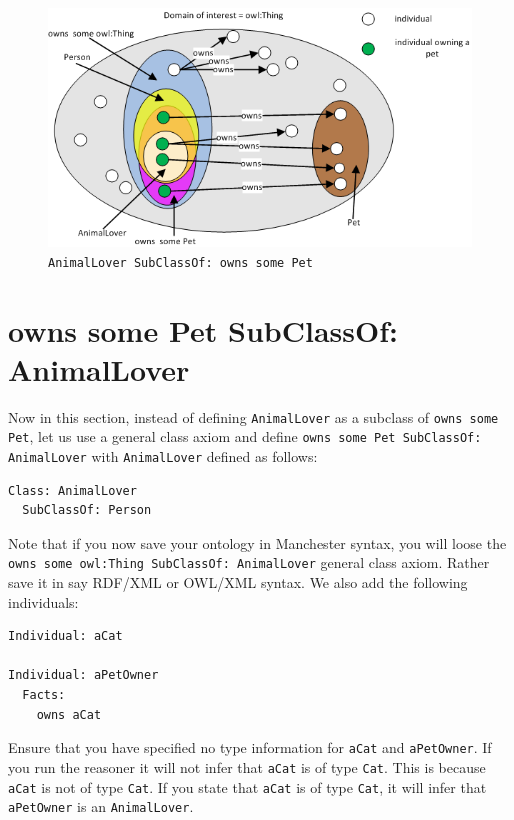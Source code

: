 \documentclass{amsart}
\begin{document}
    \begin{figure}
      \centering \includegraphics[trim = 0mm 0mm 0mm 0mm, clip, scale=0.6]{./SubClassOfOwnsSomePet.png}
      \caption{\texttt{AnimalLover SubClassOf: owns some Pet}}\label{fig_SubClassOfOwnsSomePet}
    \end{figure} 
  
  \section{owns some Pet SubClassOf: AnimalLover}
  Now in this section, instead of defining \texttt{AnimalLover} as a subclass of \texttt{owns some Pet}, let us use a general class axiom and define \texttt{owns some Pet SubClassOf: AnimalLover} with \texttt{AnimalLover} defined as follows:
\begin{small}
\begin{verbatim} 
Class: AnimalLover
  SubClassOf: Person
\end{verbatim}
\end{small}   
Note that if you now save your ontology in Manchester syntax, you will loose the \texttt{owns some owl:Thing SubClassOf: AnimalLover} general class axiom. Rather save it in say RDF/XML or OWL/XML syntax. We also add the following individuals:
\begin{small}
\begin{verbatim} 
Individual: aCat

Individual: aPetOwner
  Facts: 
    owns aCat
\end{verbatim}
\end{small}  
Ensure that you have specified no type information for \texttt{aCat} and \texttt{aPetOwner}. If you run the reasoner it will not infer that \texttt{aCat} is of type \texttt{Cat}. This is because \texttt{aCat} is not of type \texttt{Cat}. If you state that \texttt{aCat} is of type \texttt{Cat}, it will infer that \texttt{aPetOwner} is an \texttt{AnimalLover}.
\end{document}
